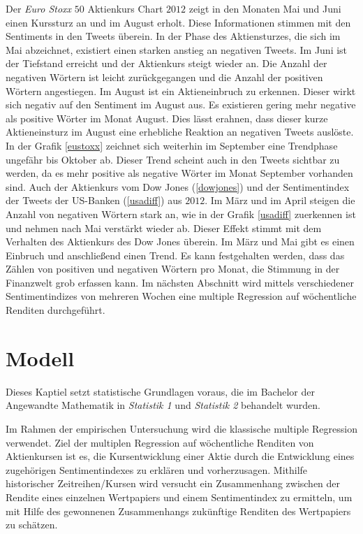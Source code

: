 Der \textit{Euro Stoxx} $50$ Aktienkurs Chart $2012$ zeigt in den Monaten Mai und Juni einen Kurssturz an und im August erholt. Diese Informationen stimmen mit den Sentiments in den Tweets überein. In der Phase des Aktiensturzes, die sich im Mai abzeichnet, existiert einen starken anstieg an negativen Tweets. Im Juni ist der Tiefstand erreicht und der Aktienkurs steigt wieder an. Die Anzahl der negativen Wörtern ist leicht zurückgegangen und die Anzahl der positiven Wörtern angestiegen. Im August ist ein Aktieneinbruch zu erkennen. Dieser wirkt sich negativ auf den Sentiment im August aus. Es existieren gering mehr negative als positive Wörter im Monat August. Dies lässt erahnen, dass dieser kurze Aktieneinsturz im August eine erhebliche Reaktion an negativen Tweets auslöste. In der Grafik \ref{eustoxx} zeichnet sich weiterhin im September eine Trendphase ungefähr bis Oktober ab. Dieser Trend scheint auch in den Tweets sichtbar zu werden, da es mehr positive als negative Wörter im Monat September vorhanden sind. Auch der Aktienkurs vom Dow Jones (\ref{dowjones}) und der Sentimentindex der Tweets der US-Banken (\ref{usadiff}) aus $2012$. Im März und im April steigen die Anzahl von negativen Wörtern stark an, wie in der Grafik \ref{usadiff} zuerkennen ist und nehmen nach Mai verstärkt wieder ab. Dieser Effekt stimmt mit dem Verhalten des Aktienkurs des Dow Jones überein. Im März und Mai gibt es einen Einbruch und anschließend einen Trend. Es kann festgehalten werden, dass das Zählen von positiven und negativen Wörtern pro Monat, die Stimmung in der Finanzwelt grob erfassen kann. Im nächsten Abschnitt wird mittels verschiedener Sentimentindizes von mehreren Wochen eine multiple Regression auf wöchentliche Renditen durchgeführt.

\section{Modell} 
Dieses Kaptiel setzt statistische Grundlagen voraus, die im Bachelor der Angewandte Mathematik in \textit{Statistik 1} und \textit{Statistik 2} behandelt wurden. 
 
Im Rahmen der empirischen Untersuchung wird die klassische multiple Regression verwendet. Ziel der multiplen Regression auf wöchentliche Renditen von Aktienkursen ist es, die Kursentwicklung einer Aktie durch die Entwicklung eines zugehörigen Sentimentindexes zu erklären und vorherzusagen. Mithilfe historischer Zeitreihen/Kursen wird versucht ein Zusammenhang zwischen der Rendite eines einzelnen Wertpapiers und einem Sentimentindex zu ermitteln, um mit Hilfe des gewonnenen Zusammenhangs zukünftige Renditen des Wertpapiers zu schätzen. \\

